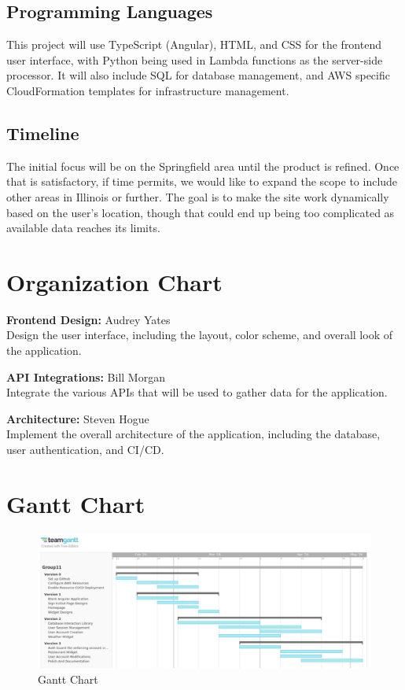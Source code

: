 \documentclass[12pt]{article}
\begin{document}
\subsection{Programming Languages}

This project will use TypeScript (Angular), HTML, and CSS for the frontend user interface, with Python being used in Lambda functions as the server-side processor. It will also include SQL for database management, and AWS specific CloudFormation templates for infrastructure management.

\subsection{Timeline}

The initial focus will be on the Springfield area until the product is refined. Once that is satisfactory, if time permits, we would like to expand the scope to include other areas in Illinois or further. The goal is to make the site work dynamically based on the user's location, though that could end up being too complicated as available data reaches its limits.

\section{Organization Chart}

\textbf{Frontend Design:} Audrey Yates \\
Design the user interface, including the layout, color scheme, and overall look of the application.

\textbf{API Integrations:} Bill Morgan \\
Integrate the various APIs that will be used to gather data for the application.

\textbf{Architecture:} Steven Hogue \\
Implement the overall architecture of the application, including the database, user authentication, and CI/CD.

\section{Gantt Chart}

\begin{figure}[H]
    \centering
    \includegraphics[width=\textwidth]{images/gantt_chart.png}
    \caption{Gantt Chart}
\end{figure}
\end{document}
